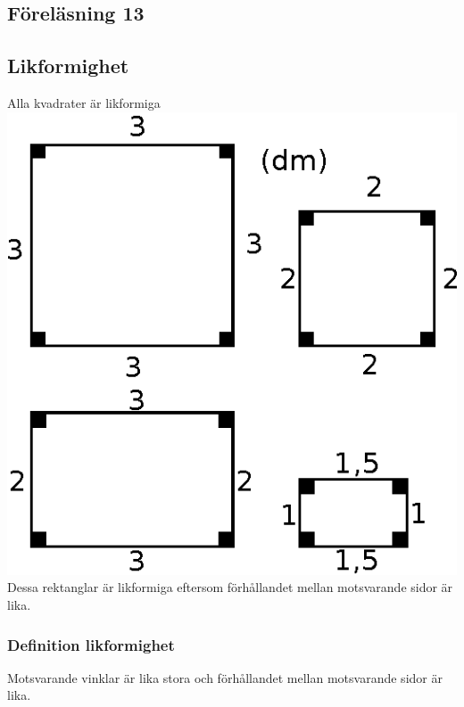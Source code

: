 \documentclass[a4paper,11pt]{article}
\begin{document}
\begin{flushleft}
\section{Föreläsning 13}
\subsection{Likformighet}
Alla kvadrater är likformiga\newline
\includegraphics{likformighet.eps}\newline
Dessa rektanglar är likformiga eftersom förhållandet mellan motsvarande sidor är lika.
\subsubsection{Definition likformighet}
Motsvarande vinklar är lika stora och förhållandet mellan motsvarande sidor är lika.


\end{flushleft}
\end{document}

